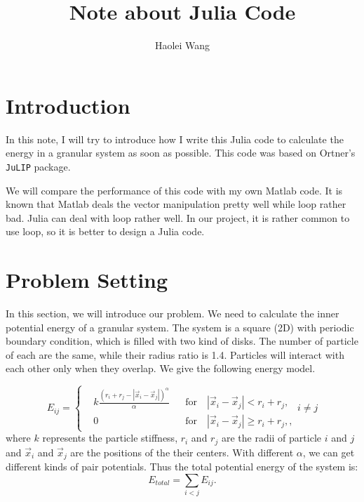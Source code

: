\documentclass[a4paper]{article}
\title{Note about Julia Code}
\author{Haolei Wang}
\begin{document}
\maketitle
\section{Introduction}

In this note, I will try to introduce how I write this Julia code to calculate the energy in a granular system as soon as possible. This code was based on Ortner's \texttt{\textprime JuLIP\textprime} package.

We will compare the performance of this code with my own Matlab code. It is known that Matlab deals the vector manipulation pretty well while loop rather bad. Julia can deal with loop rather well. In our project, it is rather common to use loop, so it is better to design a Julia code. 

\section{Problem Setting}
In this section, we will introduce our problem. We need to calculate the inner potential energy of a granular system. The system is a square (2D) with {\color{red}periodic boundary condition}, which is filled with two kind of disks. The number of particle of each are the same, while their radius ratio is 1.4. Particles will interact with each other only when they overlap. We give the following energy model.

\begin{equation} \label{eq: pair potential}
E_{ij} = \left\{
    \begin{aligned}
           & k\frac{(r_i+r_j - \left|\vec{x}_i-\vec{x}_j\right|)^{\alpha}}{\alpha} &  &\text{for} \quad \left|\vec{x}_i-\vec{x}_j\right|< r_i+r_j, \\
           & 0 &  &\text{for} \quad \left|\vec{x}_i-\vec{x}_j\right|\ge r_i+r_j, ,
    \end{aligned}  
\right.   i\ne j
\end{equation}
where $k$ represents the particle stiffness, $r_i$ and $r_j$ are the radii of particle $i$ and $j$ and $\vec{x}_i$ and $\vec{x}_j$ are the positions of the their centers. With different $\alpha$, we can get different kinds of pair potentials. Thus the total potential energy of the system is:
\begin{equation}\label{eq: total potential1}
     E_{total} = \sum_{i<j}E_{ij}.
\end{equation}
\end{document}
